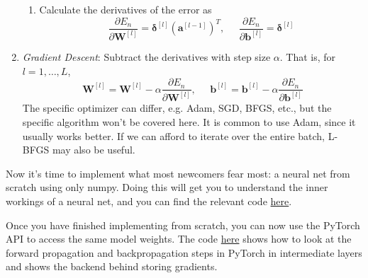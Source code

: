 \begin{algo}
\begin{enumerate}
\begin{enumerate}
        \item Calculate the derivatives of the error as 
        \begin{equation}
          \frac{\partial E_n}{\partial \mathbf{W}^{[l]}} = \boldsymbol{\delta}^{[l]} (\mathbf{a}^{[l-1]})^T, \;\;\;\;\; \frac{\partial E_n}{\partial \mathbf{b}^{[l]}} = \boldsymbol{\delta}^{[l]}
        \end{equation}
      \end{enumerate}
      
      \item \textit{Gradient Descent}: Subtract the derivatives with step size $\alpha$. That is, for $l = 1, \ldots, L$, 
      \begin{equation}
        \mathbf{W}^{[l]} = \mathbf{W}^{[l]} - \alpha \frac{\partial E_n}{\partial \mathbf{W}^{[l]}} , \;\;\;\;\; \mathbf{b}^{[l]} = \mathbf{b}^{[l]} - \alpha \frac{\partial E_n}{\partial \mathbf{b}^{[l]}}
      \end{equation}
      The specific optimizer can differ, e.g. Adam, SGD, BFGS, etc., but the specific algorithm won't be covered here. It is common to use Adam, since it usually works better. If we can afford to iterate over the entire batch, L-BFGS may also be useful. 
    \end{enumerate}
  \end{algo}

  \begin{code}
    Now it's time to implement what most newcomers fear most: a neural net from scratch using only numpy. Doing this will get you to understand the inner workings of a neural net, and you can find the relevant code \href{code/mlp_from_scratch.ipynb}{here}.  
  \end{code} 

  \begin{code}
    Once you have finished implementing from scratch, you can now use the PyTorch API to access the same model weights. The code \href{code/forward_backward.ipynb}{here} shows how to look at the forward propagation and backpropagation steps in PyTorch in intermediate layers and shows the backend behind storing gradients. 
  \end{code}

